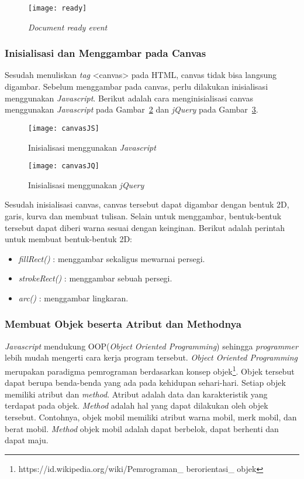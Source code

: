 \begin{figure}[H]
	\centering  
	\texttt{[image: ready]}  
	\caption[\textit{Document ready event}]{\textit{Document ready event}} 
	\label{fig:ready} 
\end{figure} 

\subsubsection{Inisialisasi dan Menggambar pada Canvas}
Sesudah menuliskan \textit{tag} <canvas> pada HTML, canvas tidak bisa langsung digambar. Sebelum menggambar pada canvas, perlu dilakukan inisialisasi menggunakan \textit{Javascript}. Berikut adalah cara menginisialisasi canvas menggunakan \textit{Javascript} pada Gambar~\ref{fig:canvasJS} dan \textit{jQuery} pada Gambar~\ref{fig:canvasJQ}.

\begin{figure}[H]
	\centering
	\caption[Inisialisasi menggunakan \textit{Javascript}]{Inisialisasi menggunakan \textit{Javascript}}
	\centering
	\texttt{[image: canvasJS]}
	\label{fig:canvasJS} 
\end{figure}

\begin{figure}[H]
	\centering
	\caption[Inisialisasi menggunakan \textit{jQuery}]{Inisialisasi menggunakan \textit{jQuery}}
	\texttt{[image: canvasJQ]}
	\label{fig:canvasJQ} 
\end{figure}

Sesudah inisialisasi canvas, canvas tersebut dapat digambar dengan bentuk 2D, garis, kurva dan membuat tulisan. Selain untuk menggambar, bentuk-bentuk tersebut dapat diberi warna sesuai dengan keinginan. Berikut adalah perintah untuk membuat bentuk-bentuk 2D: 

\begin{itemize}
	\item \textit{fillRect()} : menggambar sekaligus mewarnai persegi.
	\item \textit{strokeRect()} : menggambar sebuah persegi.
	\item \textit{arc()} : menggambar lingkaran.
\end{itemize}


\subsubsection{Membuat Objek beserta Atribut dan Methodnya}
\textit{Javascript} mendukung OOP(\textit{Object Oriented Programming}) sehingga \textit{programmer} lebih mudah mengerti cara kerja program tersebut. \textit{Object Oriented Programming} merupakan paradigma pemrograman berdasarkan konsep objek\footnote{https://id.wikipedia.org/wiki/Pemrograman\_ berorientasi\_ objek}. Objek tersebut dapat berupa benda-benda yang ada pada kehidupan sehari-hari. Setiap objek memiliki atribut dan \textit{method}. Atribut adalah data dan karakteristik yang terdapat pada objek. \textit{Method} adalah hal yang dapat dilakukan oleh objek tersebut. Contohnya, objek mobil memiliki atribut warna mobil, merk mobil, dan berat mobil. \textit{Method} objek mobil adalah dapat berbelok, dapat berhenti dan dapat maju. \\

